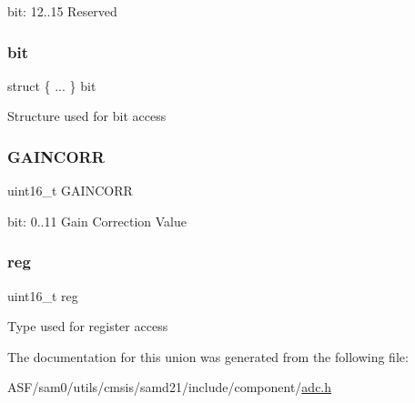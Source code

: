 bit\+: 12..15 Reserved \mbox{\label{union_a_d_c___g_a_i_n_c_o_r_r___type_a95050ada4d2143926cbf1eb10120a417}} 
\subsubsection{\texorpdfstring{bit}{bit}}
{\footnotesize\ttfamily struct \{ ... \}   bit}

Structure used for bit access \mbox{\label{union_a_d_c___g_a_i_n_c_o_r_r___type_a8c89a5e0f788ce02b3236a5501a34c53}} 
\subsubsection{\texorpdfstring{GAINCORR}{GAINCORR}}
{\footnotesize\ttfamily uint16\+\_\+t G\+A\+I\+N\+C\+O\+RR}

bit\+: 0..11 Gain Correction Value \mbox{\label{union_a_d_c___g_a_i_n_c_o_r_r___type_a11760f5020019f4aa8cb02e694f7cc44}} 
\subsubsection{\texorpdfstring{reg}{reg}}
{\footnotesize\ttfamily uint16\+\_\+t reg}

Type used for register access 

The documentation for this union was generated from the following file\+:\begin{DoxyCompactItemize}
\item 
A\+S\+F/sam0/utils/cmsis/samd21/include/component/\mbox{\hyperlink{component_2adc_8h}{adc.\+h}}\end{DoxyCompactItemize}
